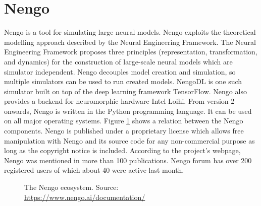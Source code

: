 \section{Nengo}

Nengo is a tool for simulating large neural models. Nengo exploits the theoretical modelling approach described by the Neural Engineering Framework. The Neural Engineering Framework proposes three principles (representation, transformation, and dynamics) for the construction of large-scale neural models which are simulator independent. Nengo decouples model creation and simulation, so multiple simulators can be used to run created models. NengoDL is one such simulator built on top of the deep learning framework TensorFlow. Nengo also provides a backend for neuromorphic hardware Intel Loihi. From version 2 onwards, Nengo is written in the Python programming language. It can be used on all major operating systems. Figure \ref{fig:nengo_ecosystem} shows a relation between the Nengo components. Nengo is published under a proprietary license which allows free manipulation with Nengo and its source code for any non-commercial purpose as long as the copyright notice is included. According to the project's webpage, Nengo was mentioned in more than 100 publications. Nengo forum has over 200 registered users of which about 40 were active last month.

\begin{figure}[ht]
    \centering
    
    \caption{The Nengo ecosystem. Source: \url{https://www.nengo.ai/documentation/}}
    \label{fig:nengo_ecosystem}
\end{figure}

